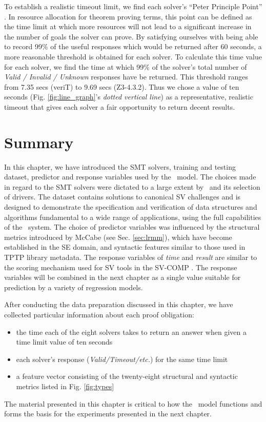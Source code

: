 To establish a realistic timeout limit, we find each solver's ``Peter Principle Point'' \cite{Sutcliffe200139}. In resource allocation for theorem proving terms, this point can be defined as the time limit at which more resources will not lead to a significant increase in the number of goals the solver can prove.
By satisfying ourselves with being able to record 99\% of the useful responses which would be returned after 60 seconds, a more reasonable threshold is obtained for each solver. 
To calculate this time value for each solver, we find the time at which 99\% of the solver's total number of \textit{Valid / Invalid / Unknown} responses have be returned. 
This threshold ranges from 7.35 secs (veriT) to 9.69 secs (Z3-4.3.2). Thus we chose a value of ten seconds (Fig. \ref{fig:line_graph}'s \textit{dotted vertical line}) as a representative, realistic timeout that gives each solver a fair opportunity to return decent results.     



\section{Summary}

In this chapter, we have introduced the SMT solvers, training and testing dataset, predictor and response variables used by the \where~model.
The choices made in regard to the SMT solvers were dictated to a large extent by \why~and its selection of drivers. 
The dataset contains solutions to canonical SV challenges and is designed to demonstrate the specification and verification of data structures and algorithms fundamental to a wide range of applications, using the full capabilities of the \why~system.
The choice of predictor variables was influenced by the structural metrics introduced by McCabe (see Sec. \ref{sec:lrmm}), which have become established in the SE domain, and syntactic features similar to those used in TPTP library metadata. 
The response variables of \textit{time} and \textit{result} are similar to the scoring mechanism used for SV tools in the SV-COMP \cite{SVCOMP}.
The response variables will be combined in the next chapter as a single value suitable for prediction by a variety of regression models.

After conducting the data preparation discussed in this chapter, we have collected particular information about each proof obligation: 
\begin{itemize}
	\item the time each of the eight solvers takes to return an answer when given a time limit value of ten seconds
	\item each solver's response (\textit{Valid/Timeout/etc.}) for the same time limit
	\item a feature vector consisting of the twenty-eight structural and syntactic metrics listed in Fig. \ref{fig:types} 
\end{itemize}   
The material presented in this chapter is critical to how the \where~model functions and forms the basis for the experiments presented in the next chapter. 
  


